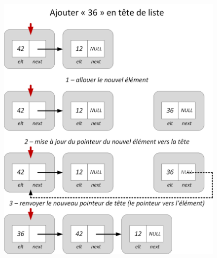 \documentclass[11pt,a4paper]{article}
\begin{document}
\begin{figure}[ht!]
\centering
\centerline{   %
\includegraphics[scale=0.85]{img/listes/Listes_Pointeurs_3_3_ajout_tete.png}
}
\end{figure}

\vfillLast

\pagebreak

\vfillFirst
\end{document}

